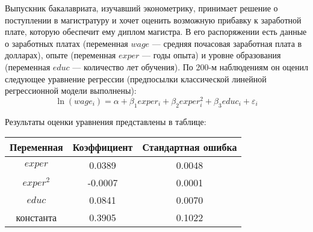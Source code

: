 \documentclass[addpoints, answers]{exam} %
\begin{document}
\begin{questions}


\question
Выпускник бакалавриата, изучавший эконометрику, принимает решение о поступлении в магистратуру и хочет оценить возможную прибавку к заработной плате, которую обеспечит ему диплом магистра. В его распоряжении есть данные о заработных платах (переменная $wage$ --- средняя почасовая заработная плата в долларах), опыте (переменная $exper$ --- годы опыта) и  уровне образования (переменная $educ$ --- количество лет обучения).  По 200-м наблюдениям он оценил следующее уравнение регрессии (предпосылки классической линейной регрессионной модели  выполнены):
\[
\ln(wage_i) = \alpha + \beta_1 exper_i + \beta_2 exper_i^2 + \beta_3 educ_i   + \varepsilon_i
\]

Результаты оценки уравнения представлены в таблице:
\begin{center}
\begin{tabular}{ccc} \toprule
Переменная & Коэффициент & Стандартная ошибка\\ \midrule
$exper$ & 0.0389 & 0.0048 \\
$exper^2$ & -0.0007 & 0.0001 \\
$educ$ & 0.0841 & 0.0070 \\
константа & 0.3905 & 0.1022 \\ \bottomrule
\end{tabular}
\end{center}


\end{questions}
\end{document}
